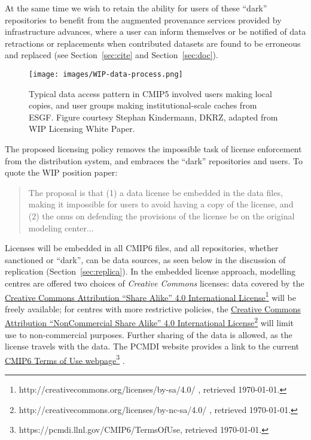 \documentclass[gmd,manuscript]{copernicus}
\begin{document}
At the same time we wish to retain the ability for users of these
``dark'' repositories to benefit from the augmented provenance
services provided by infrastructure advances, where a user can inform
themselves or be notified of data retractions or replacements when
contributed datasets are found to be erroneous and replaced (see
Section~\ref{sec:cite} and Section~\ref{sec:doc}).

\begin{figure*}
  \begin{center}
    \texttt{[image: images/WIP-data-process.png]}
  \end{center}
  \caption{Typical data access pattern in CMIP5 involved users making
    local copies, and user groups making institutional-scale caches
    from ESGF. Figure courtesy Stephan Kindermann, DKRZ, adapted from
    WIP Licensing White Paper.}
  \label{fig:dark}
\end{figure*}

The proposed licensing policy removes the impossible task of license
enforcement from the distribution system, and embraces the ``dark''
repositories and users. To quote the WIP position paper:

\begin{quote}
  The proposal is that (1) a data license be embedded in the data
  files, making it impossible for users to avoid having a copy of the
  license, and (2) the onus on defending the provisions of the license
  be on the original modeling center...
\end{quote}

Licenses will be embedded in all CMIP6 files, and all repositories,
whether sanctioned or ``dark'', can be data sources, as seen below in
the discussion of replication (Section~\ref{sec:replica}). In the
embedded license approach, modelling centres are offered two choices
of \emph{Creative Commons} licenses: data covered by the
\href{http://creativecommons.org/licenses/by-sa/4.0/ }{Creative
  Commons Attribution ``Share Alike'' 4.0 International
  License}\footnote{http://creativecommons.org/licenses/by-sa/4.0/ ,
  retrieved \today.} will be freely available; for centres with more
restrictive policies, the
\href{http://creativecommons.org/licenses/by-nc-sa/4.0/ }{Creative
  Commons Attribution ``NonCommercial Share Alike'' 4.0 International
  License}\footnote{http://creativecommons.org/licenses/by-nc-sa/4.0/
  , retrieved \today.} will limit use to non-commercial purposes.
Further sharing of the data is allowed, as the license travels with
the data. The PCMDI website provides a link to the current
\href{https://pcmdi.llnl.gov/CMIP6/TermsOfUse}{CMIP6 Terms of Use
  webpage}\footnote{https://pcmdi.llnl.gov/CMIP6/TermsOfUse, retrieved
  \today.} .
\end{document}
